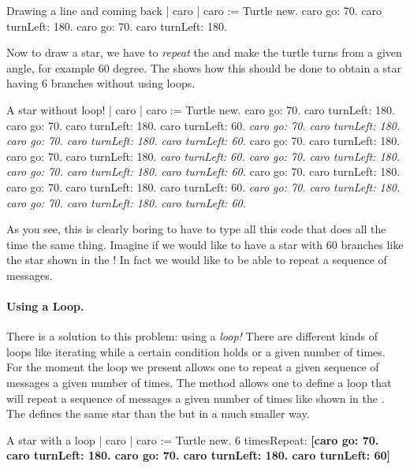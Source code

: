 \begin{scriptwithtitle}{Drawing a line and coming back}\label{scr:line}
| caro |
caro := Turtle new.
caro go: 70.
caro turnLeft: 180.
caro go: 70.
caro turnLeft: 180.
\end{scriptwithtitle}

Now to draw a star, we have to \emph{repeat} the  and make the turtle turns from a given angle, for example 60
degree. The  shows how this should be done to
obtain a star having 6 branches without using loops.

\begin{scriptwithtitle}{A star without loop!}\label{scr:star}
| caro |
caro := Turtle new.
caro go: 70.
caro turnLeft: 180.
caro go: 70.
caro turnLeft: 180.
caro turnLeft: 60. 
\textit{caro go: 70.
caro turnLeft: 180.
caro go: 70.
caro turnLeft: 180.
caro turnLeft: 60.}
caro go: 70.
caro turnLeft: 180.
caro go: 70.
caro turnLeft: 180.
\textit{caro turnLeft: 60. 
caro go: 70.
caro turnLeft: 180.
caro go: 70.
caro turnLeft: 180.
caro turnLeft: 60.} 
caro go: 70.
caro turnLeft: 180.
caro go: 70.
caro turnLeft: 180.
caro turnLeft: 60. 
\textit{caro go: 70.
caro turnLeft: 180.
caro go: 70.
caro turnLeft: 180.
caro turnLeft: 60.} 
\end{scriptwithtitle}

As you see, this is clearly boring to have to type all this code that
does all the time the same thing. Imagine if we would like to have a
star with 60 branches like the star shown in the
! In fact we would like to be able to 
repeat a sequence of messages.

\paragraph{Using a  Loop.} There is a solution to this problem: using a \emph{loop!} There are different kinds of loops like iterating while a certain condition holds or a given  number of times. For the moment the loop we present allows one to repeat a given sequence of messages a given number of times. The method \timesRepeat  {} allows one to define a loop  that will repeat a sequence of  messages a given number of times like shown in the . The  defines the same star than the 
 but in a much smaller way. 

\begin{scriptwithtitle}{A star with a loop}\label{scr:starloop}
| caro |
caro := Turtle new.
6 timesRepeat: 
     \textbf{\textbf{[}caro go: 70.
     caro turnLeft: 180.
     caro go: 70.
     caro turnLeft: 180.
     caro turnLeft: 60\textbf{]}}
\end{scriptwithtitle} 

